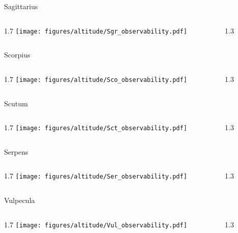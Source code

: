 \documentclass[final]{beamer}
\newlength{\colwidth}
\begin{document}
\begin{frame}[t]{}
  \Large{Sagittarius}
  \begin{columns}[T]
    \begin{column}{1.7\colwidth}
      \centering
      \texttt{[image: figures/altitude/Sgr\_observability.pdf]}
    \end{column}
    \begin{column}{1.3\colwidth}
      \Large
      
    \end{column}
  \end{columns}

  \Large{Scorpius}
  \begin{columns}[T]
    \begin{column}{1.7\colwidth}
      \centering
      \texttt{[image: figures/altitude/Sco\_observability.pdf]}
    \end{column}
    \begin{column}{1.3\colwidth}
      \Large
      
    \end{column}
  \end{columns}

  \Large{Scutum}
  \begin{columns}[T]
    \begin{column}{1.7\colwidth}
      \centering
      \texttt{[image: figures/altitude/Sct\_observability.pdf]}
    \end{column}
    \begin{column}{1.3\colwidth}
      \Large
      
    \end{column}
  \end{columns}
\end{frame}


\begin{frame}[t]{}

  \Large{Serpens}
  \begin{columns}[T]
    \begin{column}{1.7\colwidth}
      \centering
      \texttt{[image: figures/altitude/Ser\_observability.pdf]}
    \end{column}
    \begin{column}{1.3\colwidth}
      \Large
      
    \end{column}
  \end{columns}

  \Large{Vulpecula}
  \begin{columns}[T]
    \begin{column}{1.7\colwidth}
      \centering
      \texttt{[image: figures/altitude/Vul\_observability.pdf]}
    \end{column}
    \begin{column}{1.3\colwidth}
      \Large
      
    \end{column}
  \end{columns}
\end{frame}
\end{document}
